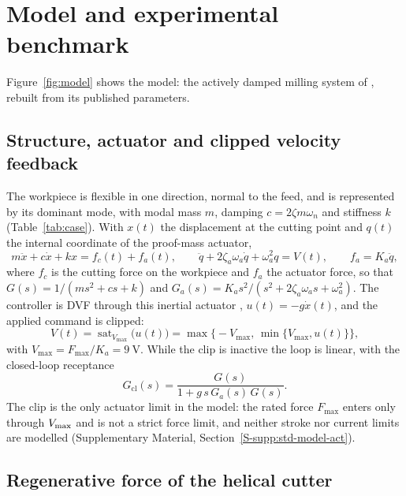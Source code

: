 \section{Model and experimental benchmark}\label{sec:model}

Figure~\ref{fig:model} shows the model: the actively damped milling system of \citet{ozsoy2026robust}, rebuilt from its published parameters.



\subsection{Structure, actuator and clipped velocity feedback}\label{sec:model-loop}

The workpiece is flexible in one direction, normal to the feed, and is represented by its dominant mode, with modal mass $m$, damping $c=2\zeta m\omega_n$ and stiffness $k$ (Table~\ref{tab:case}). With $x(t)$ the displacement at the cutting point and $q(t)$ the internal coordinate of the proof-mass actuator,
\begin{equation}\label{eq:eom}
  m\ddot x+c\dot x+kx=f_c(t)+f_a(t),\qquad
  \ddot q+2\zeta_a\omega_a\dot q+\omega_a^2q=V(t),\qquad
  f_a=K_a\ddot q ,
\end{equation}
where $f_c$ is the cutting force on the workpiece and $f_a$ the actuator force, so that $G(s)=1/(ms^2+cs+k)$ and $G_a(s)=K_as^2/(s^2+2\zeta_a\omega_as+\omega_a^2)$. The controller is DVF through this inertial actuator \citep{elliott2001feedback}, $u(t)=-g\dot x(t)$, and the applied command is clipped:
\begin{equation}\label{eq:dvf}
  V(t)=\operatorname{sat}_{V_{\max}}\bigl(u(t)\bigr)=\max\bigl\{-V_{\max},\,\min\{V_{\max},u(t)\}\bigr\},
\end{equation}
with $V_{\max}=F_{\max}/K_a=\SI{9}{\volt}$. While the clip is inactive the loop is linear, with the closed-loop receptance
\begin{equation}\label{eq:Gcl}
  G_{\mathrm{cl}}(s)=\frac{G(s)}{1+g\,s\,G_a(s)\,G(s)} .
\end{equation}
The clip is the only actuator limit in the model: the rated force $F_{\max}$ enters only through $V_{\max}$ and is not a strict force limit, and neither stroke nor current limits are modelled (Supplementary Material, Section~\ref{S-supp:std-model-act}).

\subsection{Regenerative force of the helical cutter}\label{sec:model-force}


